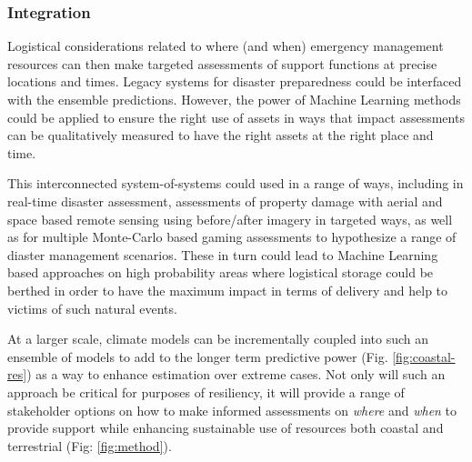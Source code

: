 \subsubsection*{Integration}

Logistical considerations related to where (and when) emergency
management resources can then make targeted assessments of support
functions at precise locations and times. Legacy systems for disaster
preparedness could be interfaced with the ensemble
predictions. However, the power of Machine Learning methods could be
applied to ensure the right use of assets in ways that impact
assessments can be qualitatively measured to have the right assets at
the right place and time. 

This interconnected system-of-systems could used in a range of ways,
including in real-time disaster assessment, assessments of property
damage with aerial and space based remote sensing using before/after
imagery in targeted ways, as well as for multiple Monte-Carlo based
gaming assessments to hypothesize a range of diaster management
scenarios. These in turn could lead to Machine Learning based approaches
on high probability areas where logistical storage could be berthed in
order to have the maximum impact in terms of delivery and help to
victims of such natural events.

At a larger scale, climate models can be incrementally coupled into
such an ensemble of models to add to the longer term predictive power
(Fig. \ref{fig:coastal-res}) as a way to enhance estimation over
extreme cases. Not only will such an approach be critical for purposes
of resiliency, it will provide a range of stakeholder options on how
to make informed assessments on \emph{where} and \emph{when} to
provide support while enhancing sustainable use of resources both
coastal and terrestrial (Fig: \ref{fig:method}).

